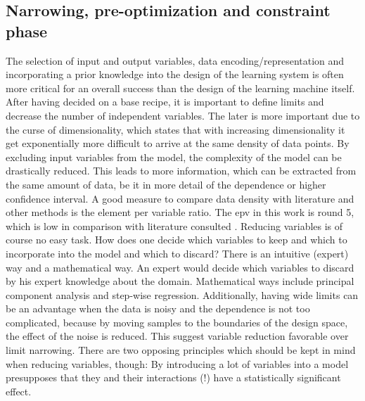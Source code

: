 \subsection{Narrowing, pre-optimization and constraint phase}
\label{sec:phase2}
The selection of input and output variables, data encoding/representation and incorporating a prior knowledge into the design of the learning system is often more critical for an overall success than the design of the learning machine itself.\cite{cherkassky1998learning} %
After having decided on a base recipe, it is important to define limits and decrease the number of independent variables. 
The later is more important due to the curse of dimensionality\cite{cherkassky1998learning}, 
which states that with increasing dimensionality it get exponentially more difficult to arrive at the same density of data points. 
By excluding input variables from the model, 
the complexity of the model can be drastically reduced. 
This leads to more information, which can be extracted from the same amount of data, 
be it in more detail of the dependence or higher confidence interval. 
A good measure to compare data density with literature and other methods is the element per variable ratio.
The \gls{epv} in this work is round 5,
which is low in comparison with literature consulted
\cite{
ahmed2017preparation,
fernandes2010multi,
kaczmarowski2015genetic,
mahdavi2017hardness,
soltanali2014neural,
panwar2014design,
schubert2008design,
shanaghi2013experimental}.
Reducing variables is of course no easy task.
How does one decide which variables to keep and which to incorporate into the model and which to discard? 
There is an intuitive (expert) way and a mathematical way.
An expert would decide which variables to discard by his expert knowledge about the domain. 
Mathematical ways include principal component analysis and step-wise regression.
%
Additionally, having wide limits can be an advantage when the data is noisy and the dependence is not too complicated, because by moving samples to the boundaries of the design space, the effect of the noise is reduced\cite{giunta2003overview}. 
This suggest variable reduction favorable over limit narrowing.
%
There are two opposing principles which should be kept in mind when reducing variables, though:
By introducing a lot of variables into a model presupposes that they and their interactions (!) have a statistically significant effect\cite{gunst2009fractional}.
